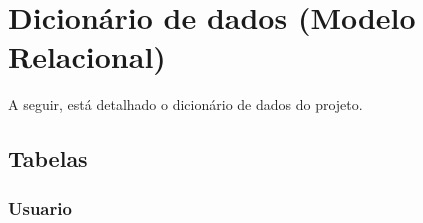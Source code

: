 \section{Dicionário de dados (Modelo Relacional)}

\vspace{5mm}

A seguir, está detalhado o dicionário de dados do projeto.


\subsection{Tabelas}
\vspace{3mm}

\subsubsection{Usuario}

